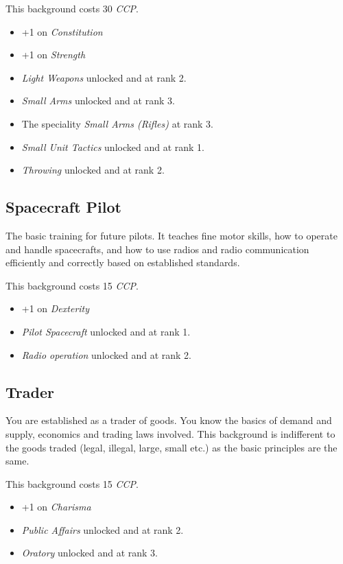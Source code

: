 This background costs 30 \emph{CCP}.

\begin{itemize}
\item +1 on \emph{Constitution}
\item +1 on \emph{Strength}
\item \emph{Light Weapons} unlocked and at rank 2.
\item \emph{Small Arms} unlocked and at rank 3.
\item The speciality \emph{Small Arms (Rifles)} at rank 3.
\item \emph{Small Unit Tactics} unlocked and at rank 1.
\item \emph{Throwing} unlocked and at rank 2.
\end{itemize}

\subsection{Spacecraft Pilot}

The basic training for future pilots. It teaches fine motor skills, how to
operate and handle spacecrafts, and how to use radios and radio communication
efficiently and correctly based on established standards.

This background costs 15 \emph{CCP}.

\begin{itemize}
\item +1 on \emph{Dexterity}
\item \emph{Pilot Spacecraft} unlocked and at rank 1.
\item \emph{Radio operation} unlocked and at rank 2.
\end{itemize}

\subsection{Trader}

You are established as a trader of goods. You know the basics of demand and
supply, economics and trading laws involved. This background is indifferent
to the goods traded (legal, illegal, large, small etc.) as the basic principles
are the same.

This background costs 15 \emph{CCP}.

\begin{itemize}
\item +1 on \emph{Charisma}
\item \emph{Public Affairs} unlocked and at rank 2.
\item \emph{Oratory} unlocked and at rank 3.
\end{itemize}
